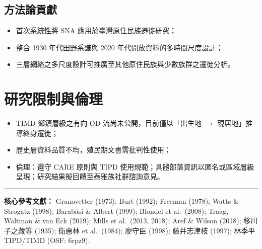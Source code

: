 \documentclass[11pt,a4paper]{article}
\begin{document}
\subsection*{方法論貢獻}
\vspace{-2pt}
\begin{itemize}
\item 首次系統性將 SNA 應用於臺灣原住民族遷徙研究；
\item 整合 1930 年代田野系譜與 2020 年代開放資料的多時間尺度設計；
\item 三層網絡之多尺度設計可推廣至其他原住民族與少數族群之遷徙分析。
\end{itemize}

\section{研究限制與倫理}
\vspace{-2pt}
\begin{itemize}
\item TIMD 鄉鎮層級之有向 OD 流尚未公開，目前僅以「出生地 $\to$ 現居地」推導終身遷徙；
\item 歷史層資料品質不均，殖民期文書需批判性使用；
\item 倫理：遵守 CARE 原則與 TIPD 使用規範；具體部落資訊以匿名或區域層級呈現；研究結果擬回饋至泰雅族社群諮詢意見。
\end{itemize}

\vspace{4pt}\hrule\vspace{2pt}
{\footnotesize\textbf{核心參考文獻：}%
Granovetter (1973); Burt (1992); Freeman (1978); Watts \& Strogatz (1998); Barab\'asi \& Albert (1999); Blondel et al.\ (2008); Traag, Waltman \& van Eck (2019); Mills et al.\ (2013, 2018); Aref \& Wilson (2018); 移川子之藏等 (1935); 衛惠林 et al.\ (1984); 廖守臣 (1998); 藤井志津枝 (1997); 林季平 TIPD/TIMD (OSF: 6rpz9).}
\end{document}
